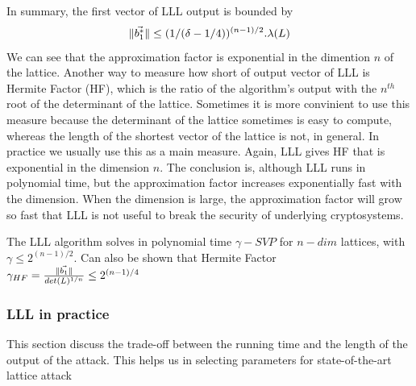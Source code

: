 
In summary, the first vector of LLL output is bounded by
\[
  \Vert \vec{b_1^*} \Vert \leq (1/(\delta-1/4))^{(n-1)/2}.\lambda(L)
\]
We can see that the approximation factor is exponential in the dimention $n$ of
the lattice. Another way to measure how short of output vector of LLL is Hermite
Factor (HF), which is the ratio of the algorithm's output with the $n^{th}$ root
of the determinant of the lattice. Sometimes it is more convinient to use this
measure because the determinant of the lattice sometimes is easy to compute,
whereas the length of the shortest vector of the lattice is not, in general. In
practice we usually use this as a main measure. Again, LLL gives HF that is
exponential in the dimension $n$. The conclusion is, although LLL runs in
polynomial time, but the approximation factor increases exponentially fast with
the dimension. When the dimension is large, the approximation factor will grow
so fast that LLL is not useful to break the security of underlying
cryptosystems.
\begin{theorem}
  The LLL algorithm solves in polynomial time $\gamma-SVP$ for $n-dim$ lattices,
  with $\gamma \leq 2^{(n-1)/2}$. Can also be shown that Hermite Factor
  $\gamma_{HF} = \frac{\Vert \vec{b_1} \Vert}{det(L)^{1/n}} \leq 2^{(n-1)/4}$
  \label{theo:LLLHF}
\end{theorem}

\subsubsection{LLL in practice}
\label{sec:LLLinPractice}
This section discuss the trade-off between the running time and the length of
the output of the attack. This helps us in selecting parameters for
state-of-the-art lattice attack

